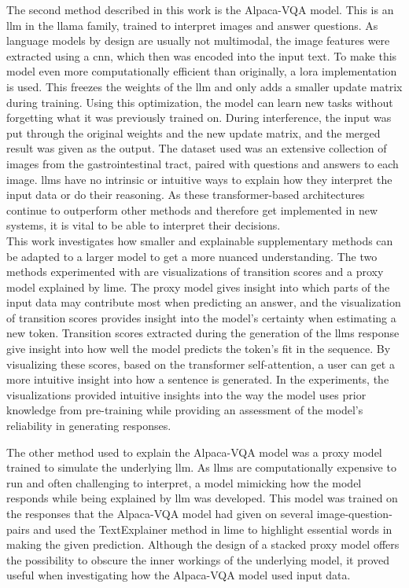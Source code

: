     The second method described in this work is the Alpaca-VQA model. This is an \gls{llm} in the \gls{llama} family, trained to interpret images and answer questions. As language models by design are usually not multimodal, the image features were extracted using a \gls{cnn}, which then was encoded into the input text. To make this model even more computationally efficient than originally, a \gls{lora} implementation is used. This freezes the weights of the \gls{llm} and only adds a smaller update matrix during training. Using this optimization, the model can learn new tasks without forgetting what it was previously trained on. During interference, the input was put through the original weights and the new update matrix, and the merged result was given as the output. The dataset used was an extensive collection of images from the gastrointestinal tract, paired with questions and answers to each image. 
    \glspl{llm} have no intrinsic or intuitive ways to explain how they interpret the input data or do their reasoning. As these transformer-based architectures continue to outperform other methods and therefore get implemented in new systems, it is vital to be able to interpret their decisions.\\
    
    
    This work investigates how smaller and explainable supplementary methods can be adapted to a larger model to get a more nuanced understanding. 
    The two methods experimented with are visualizations of transition scores and a proxy model explained by \gls{lime}. The proxy model gives insight into which parts of the input data may contribute most when predicting an answer, and the visualization of transition scores provides insight into the model's certainty when estimating a new token. 
    Transition scores extracted during the generation of the \gls{llm}s response give insight into how well the model predicts the token's fit in the sequence. By visualizing these scores, based on the transformer self-attention, a user can get a more intuitive insight into how a sentence is generated. In the experiments, the visualizations provided intuitive insights into the way the model uses prior knowledge from pre-training while providing an assessment of the model's reliability in generating responses.
    
    The other method used to explain the Alpaca-VQA model was a proxy model trained to simulate the underlying \gls{llm}. As \glspl{llm} are computationally expensive to run and often challenging to interpret, a model mimicking how the model responds while being explained by \gls{llm} was developed. This model was trained on the responses that the Alpaca-VQA model had given on several image-question-pairs and used the TextExplainer method in \gls{lime} to highlight essential words in making the given prediction. Although the design of a stacked proxy model offers the possibility to obscure the inner workings of the underlying model, it proved useful when investigating how the Alpaca-VQA model used input data.

